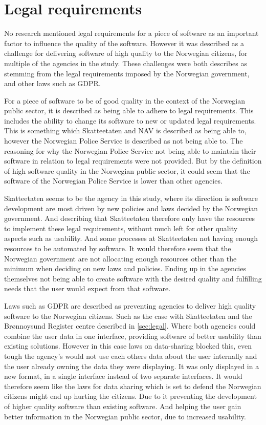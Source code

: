 \section{Legal requirements}
No research mentioned legal requirements for a piece of software as an important factor to influence the quality of the software. However it was described as a challenge for delivering software of high quality to the Norwegian citizens, for multiple of the agencies in the study. These challenges were both describes as stemming from the legal requirements imposed by the Norwegian government, and other laws such as GDPR.

For a piece of software to be of good quality in the context of the Norwegian public sector, it is described as being able to adhere to legal requirements. This includes the ability to change its software to new or updated legal requirements. This is something which Skatteetaten and NAV is described as being able to, however the Norwegian Police Service is described as not being able to. The reasoning for why the Norwegian Police Service not being able to maintain their software in relation to legal requirements were not provided. But by the definition of high software quality in the Norwegian public sector, it could seem that the software of the Norwegian Police Service is lower than other agencies.

Skatteetaten seems to be the agency in this study, where its direction is software development are most driven by new policies and laws decided by the Norwegian government. And describing that Skatteetaten therefore only have the resources to implement these legal requirements, without much left for other quality aspects such as usability. And some processes at Skatteetaten not having enough resources to be automated by software. It would therefore seem that the Norwegian government are not allocating enough resources other than the minimum when deciding on new laws and policies. Ending up in the agencies themselves not being able to create software with the desired quality and fulfilling needs that the user would expect from that software.

Laws such as GDPR are described as preventing agencies to deliver high quality software to the Norwegian citizens. Such as the case with Skatteetaten and the Brønnoysund Register centre described in \autoref{sec:legal}. Where both agencies could combine the user data in one interface, providing software of better usability than existing solutions. However in this case laws on data-sharing blocked this, even tough the agency's would not use each others data about the user internally and the user already owning the data they were displaying. It was only displayed in a new format, in a single interface instead of two separate interfaces. It would therefore seem like the laws for data sharing which is set to defend the Norwegian citizens might end up hurting the citizens. Due to it preventing the development of higher quality software than existing software. And helping the user gain better information in the Norwegian public sector, due to increased usability.

